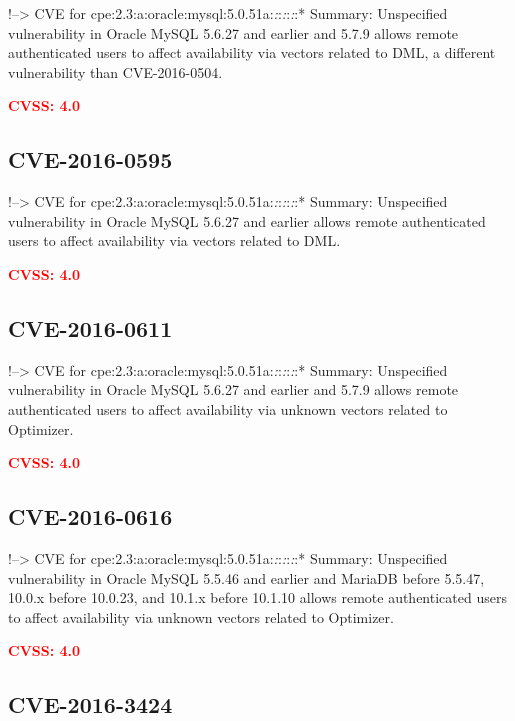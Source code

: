 \documentclass[a4paper, 12pt]{article}
\begin{document}
!--\textgreater{} CVE for
cpe:2.3:a:oracle:mysql:5.0.51a:\emph{:}:\emph{:}:\emph{:}:* Summary:
Unspecified vulnerability in Oracle MySQL 5.6.27 and earlier and 5.7.9
allows remote authenticated users to affect availability via vectors
related to DML, a different vulnerability than CVE-2016-0504.

\textbf{\textcolor{red}{CVSS: 4.0}}

\hypertarget{cve-2016-0595}{%
\subsection{CVE-2016-0595}\label{cve-2016-0595}}

!--\textgreater{} CVE for
cpe:2.3:a:oracle:mysql:5.0.51a:\emph{:}:\emph{:}:\emph{:}:* Summary:
Unspecified vulnerability in Oracle MySQL 5.6.27 and earlier allows
remote authenticated users to affect availability via vectors related to
DML.

\textbf{\textcolor{red}{CVSS: 4.0}}

\hypertarget{cve-2016-0611}{%
\subsection{CVE-2016-0611}\label{cve-2016-0611}}

!--\textgreater{} CVE for
cpe:2.3:a:oracle:mysql:5.0.51a:\emph{:}:\emph{:}:\emph{:}:* Summary:
Unspecified vulnerability in Oracle MySQL 5.6.27 and earlier and 5.7.9
allows remote authenticated users to affect availability via unknown
vectors related to Optimizer.

\textbf{\textcolor{red}{CVSS: 4.0}}

\hypertarget{cve-2016-0616}{%
\subsection{CVE-2016-0616}\label{cve-2016-0616}}

!--\textgreater{} CVE for
cpe:2.3:a:oracle:mysql:5.0.51a:\emph{:}:\emph{:}:\emph{:}:* Summary:
Unspecified vulnerability in Oracle MySQL 5.5.46 and earlier and MariaDB
before 5.5.47, 10.0.x before 10.0.23, and 10.1.x before 10.1.10 allows
remote authenticated users to affect availability via unknown vectors
related to Optimizer.

\textbf{\textcolor{red}{CVSS: 4.0}}

\hypertarget{cve-2016-3424}{%
\subsection{CVE-2016-3424}\label{cve-2016-3424}}
\end{document}
